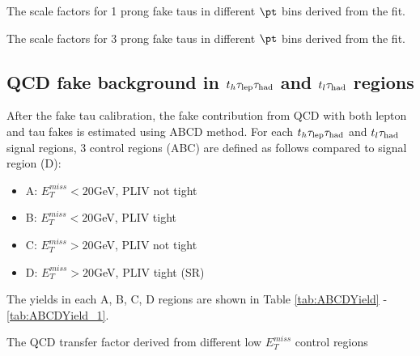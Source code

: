 \begin{table}
\caption{The scale factors for 1 prong fake taus in different $\pt$ bins derived from the fit.}
\label{tab:scale_factor_1prong_statonly}

\end{table}
\begin{table}
\caption{The scale factors for 3 prong fake taus in different $\pt$ bins derived from the fit.}
\label{tab:scale_factor_3prong_statonly}

\end{table}


\subsection{QCD fake background in $t_h\tau_\text{lep}{}\tau_\text{had}$ and $t_l\tau_\text{had}$ regions}
\label{sec:ABCD}
After the fake tau calibration, the fake contribution from QCD with both lepton and tau fakes is estimated using ABCD method. For each $t_h\tau_\text{lep}{}\tau_\text{had}$ and $t_l\tau_\text{had}$ signal regions, 3 control regions (ABC) are defined as follows compared to signal region (D):

\begin{itemize}
	\item A: $E_T^{miss}<20$GeV, PLIV not tight
	\item B: $E_T^{miss}<20$GeV, PLIV tight
	\item C: $E_T^{miss}>20$GeV, PLIV not tight
	\item D: $E_T^{miss}>20$GeV, PLIV tight (SR)
\end{itemize}

The yields in each A, B, C, D regions are shown in Table \ref{tab:ABCDYield} - \ref{tab:ABCDYield_1}.

%
%
%
%
\begin{table}
\caption{The QCD transfer factor derived from different low $E_T^{miss}$ control regions}
\label{tab:FF}

\end{table}

